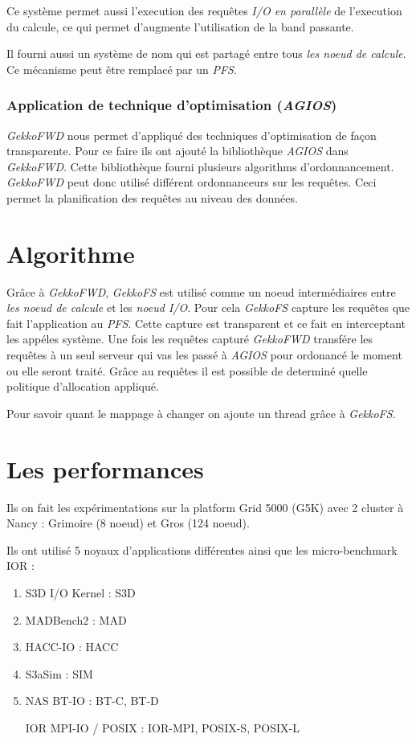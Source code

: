 \documentclass[10pt, a4paper]{article}
\begin{document}
Ce système permet aussi l'execution des requêtes \emph{I/O en parallèle} de l'execution du calcule, ce qui permet d'augmente l'utilisation de la band passante.

Il fourni aussi un système de nom qui est partagé entre tous \emph{les noeud de calcule}. Ce mécanisme peut être remplacé par un \emph{PFS}.

\subsubsection{Application de technique d'optimisation (\emph{AGIOS})}

\emph{GekkoFWD} nous permet d'appliqué des techniques d'optimisation de façon transparente. Pour ce faire ils ont ajouté la bibliothèque \emph{AGIOS} dans \emph{GekkoFWD}. Cette bibliothèque fourni plusieurs algorithms d'ordonnancement.
\emph{GekkoFWD} peut donc utilisé différent ordonnanceurs sur les requêtes. Ceci permet la planification des requêtes au niveau des données.

\section{Algorithme}

Grâce à \emph{GekkoFWD}, \emph{GekkoFS} est utilisé comme un noeud intermédiaires entre \emph{les noeud de calcule} et les \emph{noeud I/O}. Pour cela \emph{GekkoFS} capture les requêtes que fait l'application au \emph{PFS}. Cette capture est transparent et ce fait en interceptant les appéles système. Une fois les requêtes capturé \emph{GekkoFWD} transfére les requêtes à un seul serveur qui vas les passé à \emph{AGIOS} pour ordonancé le moment ou elle seront traité. Grâce au requêtes il est possible de determiné quelle politique d'allocation appliqué.

Pour savoir quant le mappage à changer on ajoute un thread grâce à \emph{GekkoFS}.

\section{Les performances}

Ils on fait les expérimentations sur la platform Grid 5000 (G5K) avec 2 cluster à Nancy : Grimoire (8 noeud) et Gros (124 noeud).

Ils ont utilisé 5 noyaux d'applications différentes ainsi que les micro-benchmark IOR :
\begin{enumerate}
  \item S3D I/O Kernel : S3D
  \item MADBench2 : MAD
  \item HACC-IO : HACC
  \item S3aSim : SIM
  \item NAS BT-IO : BT-C, BT-D
  \item [IOR] MPI-IO / POSIX : IOR-MPI, POSIX-S, POSIX-L
\end{enumerate}
\end{document}
